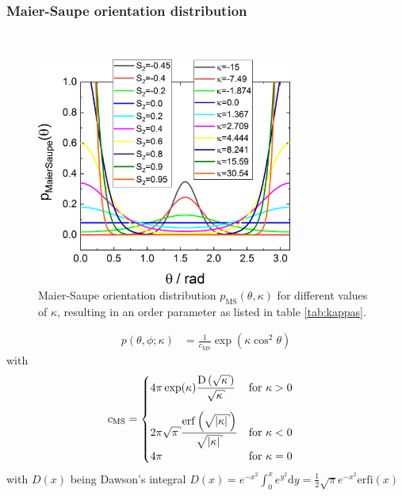 \clearpage
\subsubsection{Maier-Saupe orientation distribution} ~\\

\begin{figure}[htb]
\includegraphics[width=0.75\textwidth]{../images/form_factor/cylindrical_obj/pMaierSaupeGr.png}
\caption{Maier-Saupe orientation distribution $p_\mathrm{MS}(\theta,\kappa)$ for different values of $\kappa$, resulting in an order parameter as listed in table \ref{tab:kappas}.}
\label{fig:pMaierSaupeGr}
\end{figure}

\begin{align}
p(\theta,\phi;\kappa) & = \frac{1}{c_\mathrm{MS}}\exp\left(\kappa \cos^2\theta\right)
\end{align}
with
\begin{align}
c_\mathrm{MS} &=
\begin{cases}
\displaystyle
4\pi\exp(\kappa) \frac{\mathrm{D}\left(\sqrt{\kappa}\right)}{\sqrt{\kappa}}   &\mathrm{for~} \kappa > 0 \\[5mm]
\displaystyle
2\pi \sqrt{\pi} \frac{\mathrm{erf}\left(\sqrt{\abs{\kappa}}\right)}{\sqrt{\abs{\kappa}}}  &\mathrm{for~} \kappa < 0 \\[2mm]
\displaystyle
4\pi                                                                                      &\mathrm{for~} \kappa = 0
\end{cases}
\end{align}
with $D(x)$ being Dawson's integral $D(x)=e^{-x^2}\int_0^x e^{y^2} \mathrm{d}y = \frac12\sqrt{\pi}e^{-x^2}\mathrm{erfi}(x)$

